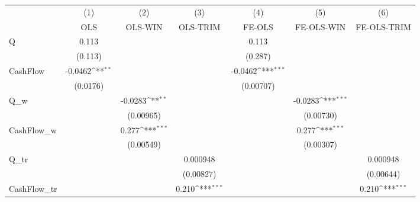 {
\def\sym#1{\ifmmode^{#1}\else\(^{#1}\)\fi}
\begin{tabular}{l*{6}{c}}
\hline\hline
            &\multicolumn{1}{c}{(1)}         &\multicolumn{1}{c}{(2)}         &\multicolumn{1}{c}{(3)}         &\multicolumn{1}{c}{(4)}         &\multicolumn{1}{c}{(5)}         &\multicolumn{1}{c}{(6)}         \\
            &         OLS         &     OLS-WIN         &    OLS-TRIM         &      FE-OLS         &  FE-OLS-WIN         & FE-OLS-TRIM         \\
\hline
Q           &       0.113         &                     &                     &       0.113         &                     &                     \\
            &     (0.113)         &                     &                     &     (0.287)         &                     &                     \\
CashFlow    &     -0.0462\sym{**} &                     &                     &     -0.0462\sym{***}&                     &                     \\
            &    (0.0176)         &                     &                     &   (0.00707)         &                     &                     \\
Q\_w         &                     &     -0.0283\sym{**} &                     &                     &     -0.0283\sym{***}&                     \\
            &                     &   (0.00965)         &                     &                     &   (0.00730)         &                     \\
CashFlow\_w  &                     &       0.277\sym{***}&                     &                     &       0.277\sym{***}&                     \\
            &                     &   (0.00549)         &                     &                     &   (0.00307)         &                     \\
Q\_tr        &                     &                     &    0.000948         &                     &                     &    0.000948         \\
            &                     &                     &   (0.00827)         &                     &                     &   (0.00644)         \\
CashFlow\_tr &                     &                     &       0.210\sym{***}&                     &                     &       0.210\sym{***}\\

\end{tabular}}
